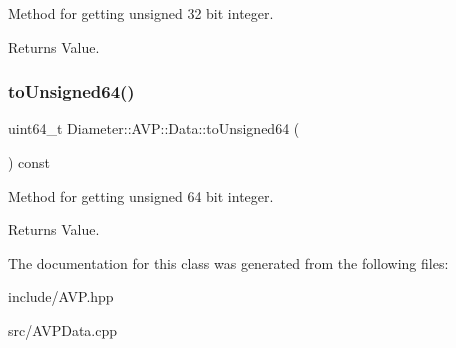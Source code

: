 Method for getting unsigned 32 bit integer. 

\begin{DoxyReturn}{Returns}
Value. 
\end{DoxyReturn}
\mbox{\label{classDiameter_1_1AVP_1_1Data_a57371b621b2e27eb2988b232f5a84a43}} 
\subsubsection{\texorpdfstring{to\+Unsigned64()}{toUnsigned64()}}
{\footnotesize\ttfamily uint64\+\_\+t Diameter\+::\+A\+V\+P\+::\+Data\+::to\+Unsigned64 (\begin{DoxyParamCaption}{ }\end{DoxyParamCaption}) const}



Method for getting unsigned 64 bit integer. 

\begin{DoxyReturn}{Returns}
Value. 
\end{DoxyReturn}


The documentation for this class was generated from the following files\+:\begin{DoxyCompactItemize}
\item 
include/A\+V\+P.\+hpp\item 
src/A\+V\+P\+Data.\+cpp\end{DoxyCompactItemize}
